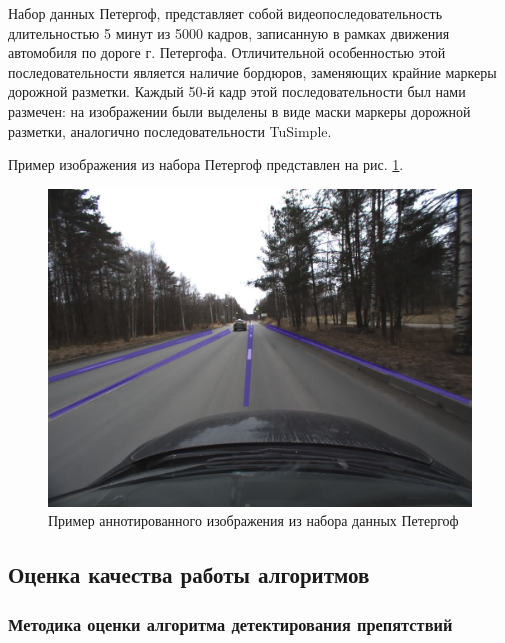 \documentclass[aps,%
14pt,%
final,%
oneside,
onecolumn,%
musixtex, %
superscriptaddress,%
centertags]{extarticle} %
\begin{document}
Набор данных Петергоф, представляет собой видеопоследовательность длительностью 5 минут из 5000 кадров, записанную в рамках движения автомобиля по дороге г. Петергофа. Отличительной особенностью этой последовательности является наличие бордюров, заменяющих крайние маркеры дорожной разметки. Каждый 50-й кадр этой последовательности был нами размечен: на изображении были выделены в виде маски маркеры дорожной разметки, аналогично последовательности TuSimple.

Пример изображения из набора Петергоф  представлен на рис. \ref{fig:ex_mm}.

\begin{figure}[htp]
\centering
\includegraphics[scale=0.2]{ex_mm.jpg}
\caption{Пример аннотированного изображения из набора данных Петергоф}
\label{fig:ex_mm}
\end{figure}

\subsection{Оценка качества работы алгоритмов}

\subsubsection{Методика оценки алгоритма детектирования препятствий}
\end{document}
